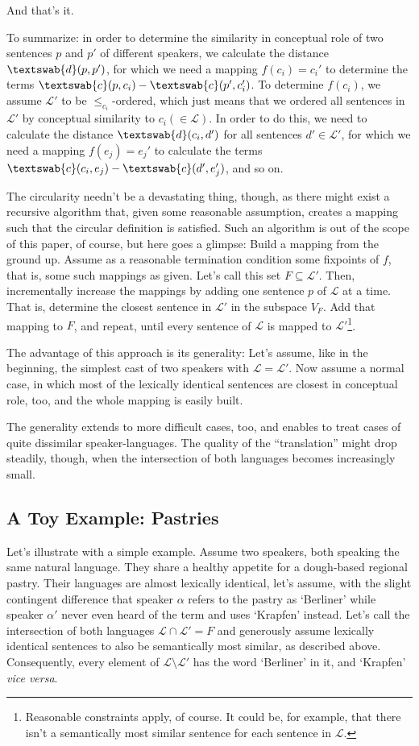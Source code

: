 \documentclass[11pt, a4paper]{scrartcl}
\renewcommand{\i}[1]{\emph{#1}}
\renewcommand{\L}{\mathcal{L}}
\newcommand{\m}[1]{\textswab{#1}}
\begin{document}
And that's it. 

To summarize: in order to determine the similarity in conceptual role of two sentences $p$ and $p'$ of different speakers, we calculate the distance $\m{d}(p,p')$, for which we need a mapping $f(c_i) = c_i'$ to determine the terms $\m{c}(p,c_i) - \m{c}(p',c_i')$. To determine $f(c_i)$, we assume $\L'$ to be $\leqslant_{c_i}$-ordered, which just means that we ordered all sentences in $\L'$ by conceptual similarity to $c_i (\in \L)$. In order to do this, we need to calculate the distance $\m{d}(c_i,d')$ for all sentences $d' \in \L'$, for which we need a mapping $f(e_j) = e_j'$ to calculate the terms $\m{c}(c_i,e_j) - \m{c}(d',e_j')$, and so on.

The circularity needn't be a devastating thing, though, as there might exist a recursive algorithm that, given some reasonable assumption, creates a mapping such that the circular definition is satisfied. Such an algorithm is out of the scope of this paper, of course, but here goes a glimpse: Build a mapping from the ground up. Assume as a reasonable termination condition some fixpoints of $f$, that is, some such mappings as given. Let's call this set $F \subseteq \L'$. Then, incrementally increase the mappings by adding one sentence $p$ of $\L$ at a time. That is, determine the closest sentence in $\L'$ in the subspace $V_F$. Add that mapping to $F$, and repeat, until every sentence of $\L$ is mapped to $\L'$\footnote{Reasonable constraints apply, of course. It could be, for example, that there isn't a semantically most similar sentence for each sentence in $\L$.}.   

The advantage of this approach is its generality: Let's assume, like in the beginning, the simplest cast of two speakers with $\L = \L'$. Now assume a normal case, in which most of the lexically identical sentences are closest in conceptual role, too, and the whole mapping is easily built. 

The generality extends to more difficult cases, too, and enables to treat cases of quite dissimilar speaker-languages. The quality of the ``translation'' might drop steadily, though, when the intersection of both languages becomes increasingly small. 

\subsection{A Toy Example: Pastries}

Let's illustrate with a simple example. Assume two speakers, both speaking the same natural language. They share a healthy appetite for a dough-based regional pastry. Their languages are almost lexically identical, let's assume, with the slight contingent difference that speaker $\alpha$ refers to the pastry as `Berliner' while speaker $\alpha'$ never even heard of the term and uses `Krapfen' instead. Let's call the intersection of both languages $\L \cap \L' = F$ and generously assume lexically identical sentences to also be semantically most similar, as described above. Consequently, every element of $\L\setminus \L'$ has the word `Berliner' in it, and `Krapfen' \i{vice versa}.
\end{document}
